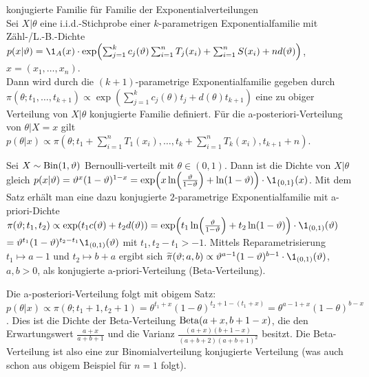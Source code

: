 \begin{Satz}{konjugierte Familie für Familie der Exponentialverteilungen}\\
    Sei $X|\theta$ eine i.i.d.-Stichprobe einer $k$-parametrigen Exponentialfamilie mit
    Zähl-/L.-B.-Dichte\\
    $p(x|\theta) = \1_A(x) \cdot \exp\!\left(\sum_{j=1}^k c_j(\theta)
    \sum_{i=1}^n T_j(x_i) + \sum_{i=1}^n S(x_i) + n d(\theta)\right)$, $x = (x_1, \dotsc, x_n)$.\\
    Dann wird durch die $(k + 1)$-parametrige Exponentialfamilie gegeben durch\\
    $\pi(\theta; t_1, \dotsc, t_{k+1}) \propto
    \exp\!\left(\sum_{j=1}^k c_j(\theta) t_j + d(\theta) t_{k+1}\right)$
    eine zu obiger Verteilung von $X|\theta$ konjugierte Familie definiert.
    Für die a-posteriori-Verteilung von $\theta|X = x$ gilt\\
    $p(\theta|x) \propto \pi\!\left(\theta; t_1 + \sum_{i=1}^n T_1(x_i), \dotsc,
    t_k + \sum_{i=1}^n T_k(x_i), t_{k+1} + n\right)$.
\end{Satz}

\linie

\begin{Bsp}
    Sei $X \sim \operatorname{Bin}(1, \vartheta)$ Bernoulli-verteilt mit $\theta \in (0, 1)$.
    Dann ist die Dichte von $X|\theta$ gleich
    $p(x|\theta) = \theta^x (1 - \theta)^{1-x} =
    \exp\!\left(x \ln\!\left(\frac{\theta}{1-\theta}\right) + \ln(1 - \theta)\right)
    \cdot \1_{\{0, 1\}}(x)$.
    Mit dem Satz erhält man eine dazu konjugierte $2$-parametrige Exponentialfamilie mit
    a-priori-Dichte\\
    $\pi(\theta; t_1, t_2) \propto \exp(t_1 c(\theta) + t_2 d(\theta))
    = \exp\!\left(t_1 \ln\!\left(\frac{\theta}{1 - \theta}\right) + t_2 \ln(1 - \theta)\right) \cdot
    \1_{(0,1)}(\theta)$\\
    $= \theta^{t_1} (1 - \theta)^{t_2 - t_1} \1_{(0, 1)}(\theta)$
    mit $t_1, t_2 - t_1 > -1$.
    Mittels Reparametrisierung $t_1 \mapsto a - 1$ und $t_2 \mapsto b + a$
    ergibt sich $\widetilde{\pi}(\theta; a, b) \propto
    \vartheta^{a-1} (1 - \vartheta)^{b-1} \cdot \1_{(0,1)}(\theta)$, $a, b > 0$,
    als konjugierte a-priori-Verteilung (Beta-Verteilung).
    
    Die a-posteriori-Verteilung folgt mit obigem Satz:
    $p(\theta|x) \propto \pi(\theta; t_1 + 1, t_2 + 1)
    = \theta^{t_1+x} (1 - \theta)^{t_2 + 1 - (t_1 + x)} = \theta^{a-1+x} (1 - \theta)^{b-x}$.
    Dies ist die Dichte der Beta-Verteilung $\operatorname{Beta}(a+x, b+1-x)$,
    die den Erwartungswert $\frac{a+x}{a+b+1}$ und die Varianz
    $\frac{(a+x)(b+1-x)}{(a+b+2)(a+b+1)^2}$ besitzt.
    Die Beta-Verteilung ist also eine zur Binomialverteilung konjugierte Verteilung
    (was auch schon aus obigem Beispiel für $n = 1$ folgt).
\end{Bsp}

